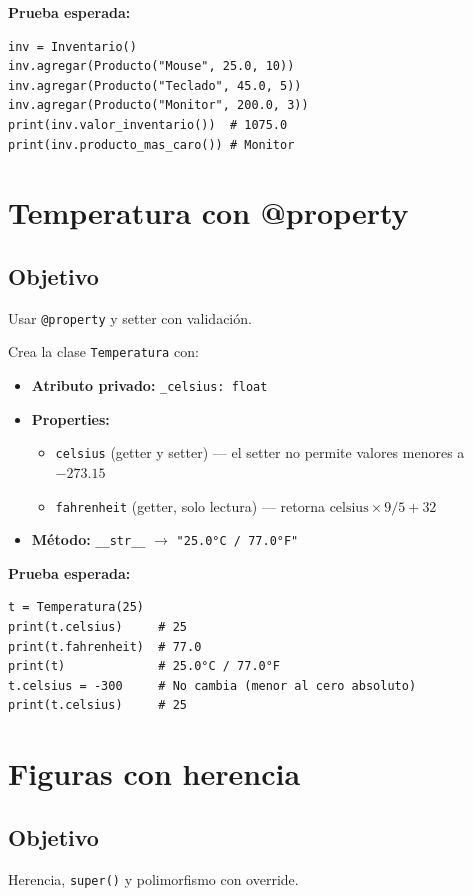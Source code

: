 \documentclass[11pt,letterpaper]{article}
\begin{document}
\textbf{Prueba esperada:}
\begin{lstlisting}
inv = Inventario()
inv.agregar(Producto("Mouse", 25.0, 10))
inv.agregar(Producto("Teclado", 45.0, 5))
inv.agregar(Producto("Monitor", 200.0, 3))
print(inv.valor_inventario())  # 1075.0
print(inv.producto_mas_caro()) # Monitor
\end{lstlisting}

\section{Temperatura con @property}
\subsection{Objetivo} Usar \texttt{@property} y setter con validación.

Crea la clase \texttt{Temperatura} con:
\begin{itemize}[nosep]
  \item \textbf{Atributo privado:} \texttt{\_celsius: float}
  \item \textbf{Properties:}
  \begin{itemize}[nosep]
    \item \texttt{celsius} (getter y setter) --- el setter no permite valores menores a $-273.15$
    \item \texttt{fahrenheit} (getter, solo lectura) --- retorna $\text{celsius} \times 9/5 + 32$
  \end{itemize}
  \item \textbf{Método:} \texttt{\_\_str\_\_} $\to$ \texttt{"25.0°C / 77.0°F"}
\end{itemize}

\textbf{Prueba esperada:}
\begin{lstlisting}
t = Temperatura(25)
print(t.celsius)     # 25
print(t.fahrenheit)  # 77.0
print(t)             # 25.0°C / 77.0°F
t.celsius = -300     # No cambia (menor al cero absoluto)
print(t.celsius)     # 25
\end{lstlisting}

\section{Figuras con herencia}
\subsection{Objetivo} Herencia, \texttt{super()} y polimorfismo con override.
\end{document}

